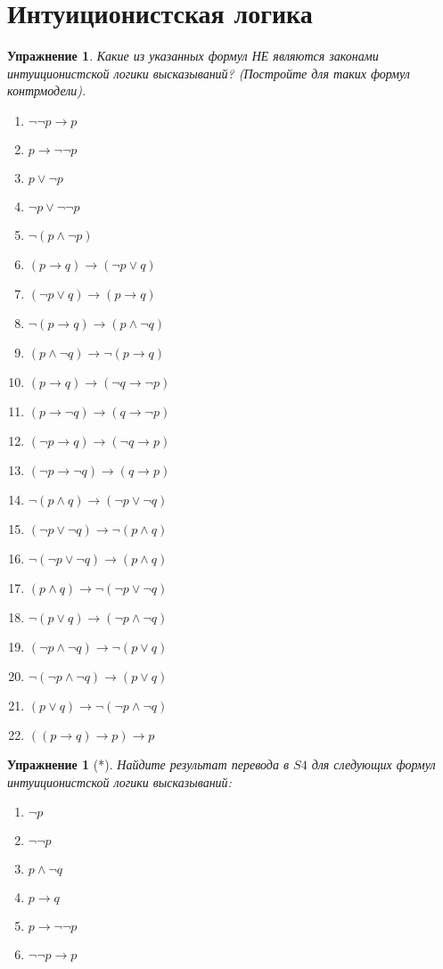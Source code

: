 \documentclass[11pt]{article}
\newtheorem{exercise}[theorem]{Упражнение}
\begin{document}
\section{Интуиционистская логика}
\begin{exercise} Какие из указанных формул НЕ являются законами интуиционистской логики высказываний? (Постройте для таких формул контрмодели).
\begin{multicols}{2}
\begin{enumerate}
	\item $\neg \neg p \to p$
	\item $p \to \neg \neg p$
	\item $p \vee \neg p$
	\item $\neg p \vee \neg \neg p$
	\item $\neg (p \wedge \neg p)$
	\item $(p \to q) \to (\neg p \vee q)$
	\item $(\neg p \vee q) \to (p \to q)$
	\item $\neg (p \to q) \to (p \wedge \neg q)$
	\item $(p \wedge \neg q) \to \neg (p \to q) $
	\item $(p \to q) \to (\neg q \to \neg p)$
	\item $(p \to \neg q) \to (q \to \neg p)$
	\item $(\neg p \to q) \to (\neg q \to p)$
	\item $(\neg p \to \neg q) \to (q \to p)$
	\item $\neg (p \wedge q) \to (\neg p \vee \neg q)$
    \item $(\neg p \vee \neg q) \to \neg (p \wedge q)$
    \item $\neg (\neg p \vee \neg q) \to (p \wedge q)$
    \item $(p \wedge q) \to \neg (\neg p \vee \neg q)$
  	\item $\neg (p \vee q) \to (\neg p \wedge \neg q)$
  	\item $(\neg p \wedge \neg q) \to \neg (p \vee q)$
    \item $\neg  (\neg p \wedge  \neg q) \to (p \vee q)$
    \item $(p \vee q) \to \neg  (\neg p \wedge  \neg q)$
    \item $((p \to q) \to p) \to p $
\end{enumerate}
\end{multicols}
\end{exercise}

\begin{exercise}[*] Найдите результат перевода в $S4$ для следующих формул интуиционистской логики высказываний:
\begin{multicols}{3}
\begin{enumerate}
\item $\neg p$	
\item $\neg \neg p$	
\item $p \wedge \neg q$
\item $p \to q$
\item $p \to \neg \neg p$
\item $\neg \neg p \to p  $
\end{enumerate}
\end{multicols}	
\end{exercise}
\end{document}
